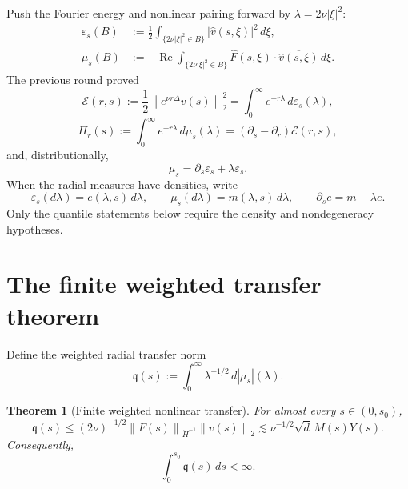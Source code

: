 \documentclass[11pt]{article}
\newtheorem{theorem}{Theorem}
\theoremstyle{remark}
\newcommand{\norm}[1]{\left\|#1\right\|}
\begin{document}
Push the Fourier energy and nonlinear pairing forward by
\(\lambda=2\nu|\xi|^2\):
\begin{align}
\label{eq:epsilon}
 \varepsilon_s(B)
 &:=
 \frac12\int_{\{2\nu|\xi|^2\in B\}}
 |\widehat v(s,\xi)|^2\,d\xi,\\
\label{eq:mu}
 \mu_s(B)
 &:=
 -\operatorname{Re}
 \int_{\{2\nu|\xi|^2\in B\}}
 \widehat F(s,\xi)\cdot\overline{\widehat v(s,\xi)}\,d\xi.
\end{align}
The previous round proved
\begin{equation}
\label{eq:characteristic}
 \mathcal E(r,s):=
 \frac12\norm{e^{\nu r\Delta}v(s)}_2^2
 =\int_0^\infty e^{-r\lambda}\,d\varepsilon_s(\lambda),
\end{equation}
\begin{equation}
\label{eq:flux}
 \Pi_r(s):=\int_0^\infty e^{-r\lambda}\,d\mu_s(\lambda)
 =(\partial_s-\partial_r)\mathcal E(r,s),
\end{equation}
and, distributionally,
\begin{equation}
\label{eq:measure-balance}
 \mu_s=\partial_s\varepsilon_s+\lambda\varepsilon_s.
\end{equation}
When the radial measures have densities, write
\begin{equation}
\label{eq:density-balance}
 \varepsilon_s(d\lambda)=e(\lambda,s)\,d\lambda,
 \qquad
 \mu_s(d\lambda)=m(\lambda,s)\,d\lambda,
 \qquad
 \partial_se=m-\lambda e.
\end{equation}
Only the quantile statements below require the density and
nondegeneracy hypotheses.

\section{The finite weighted transfer theorem}

Define the weighted radial transfer norm
\begin{equation}
\label{eq:q-def}
 \mathfrak q(s):=
 \int_0^\infty\lambda^{-1/2}\,d|\mu_s|(\lambda).
\end{equation}

\begin{theorem}[Finite weighted nonlinear transfer]
\label{thm:weighted}
For almost every \(s\in(0,s_0)\),
\begin{equation}
\label{eq:q-bound}
 \mathfrak q(s)
 \le
 (2\nu)^{-1/2}
 \norm{F(s)}_{\dot H^{-1}}\norm{v(s)}_2
 \lesssim
 \nu^{-1/2}\sqrt d\,M(s)Y(s).
\end{equation}
Consequently,
\begin{equation}
\label{eq:q-L1}
 \int_0^{s_0}\mathfrak q(s)\,ds<\infty.
\end{equation}
\end{theorem}
\end{document}
